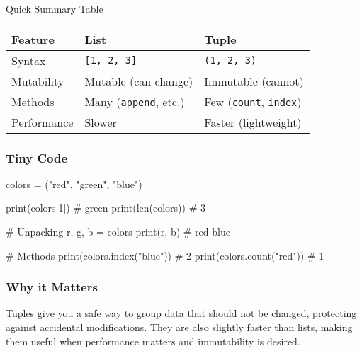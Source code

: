 \documentclass[
  letterpaper,
  DIV=11,
  numbers=noendperiod]{scrreprt}
\newenvironment{Shaded}{\begin{snugshade}}{\end{snugshade}}
\newcommand{\BuiltInTok}[1]{\textcolor[rgb]{0.00,0.23,0.31}{#1}}
\newcommand{\CommentTok}[1]{\textcolor[rgb]{0.37,0.37,0.37}{#1}}
\newcommand{\DecValTok}[1]{\textcolor[rgb]{0.68,0.00,0.00}{#1}}
\newcommand{\NormalTok}[1]{\textcolor[rgb]{0.00,0.23,0.31}{#1}}
\newcommand{\OperatorTok}[1]{\textcolor[rgb]{0.37,0.37,0.37}{#1}}
\newcommand{\StringTok}[1]{\textcolor[rgb]{0.13,0.47,0.30}{#1}}
\begin{document}
Quick Summary Table

\begin{longtable}[]{@{}lll@{}}
\toprule\noalign{}
Feature & List & Tuple \\
\midrule\noalign{}
\endhead
\bottomrule\noalign{}
\endlastfoot
Syntax & \texttt{{[}1,\ 2,\ 3{]}} & \texttt{(1,\ 2,\ 3)} \\
Mutability & Mutable (can change) & Immutable (cannot) \\
Methods & Many (\texttt{append}, etc.) & Few (\texttt{count},
\texttt{index}) \\
Performance & Slower & Faster (lightweight) \\
\end{longtable}

\subsubsection{Tiny Code}\label{tiny-code-24}

\begin{Shaded}
\begin{Highlighting}[]
\NormalTok{colors }\OperatorTok{=}\NormalTok{ (}\StringTok{"red"}\NormalTok{, }\StringTok{"green"}\NormalTok{, }\StringTok{"blue"}\NormalTok{)}

\BuiltInTok{print}\NormalTok{(colors[}\DecValTok{1}\NormalTok{])       }\CommentTok{\# green}
\BuiltInTok{print}\NormalTok{(}\BuiltInTok{len}\NormalTok{(colors))     }\CommentTok{\# 3}

\CommentTok{\# Unpacking}
\NormalTok{r, g, b }\OperatorTok{=}\NormalTok{ colors}
\BuiltInTok{print}\NormalTok{(r, b)            }\CommentTok{\# red blue}

\CommentTok{\# Methods}
\BuiltInTok{print}\NormalTok{(colors.index(}\StringTok{"blue"}\NormalTok{))  }\CommentTok{\# 2}
\BuiltInTok{print}\NormalTok{(colors.count(}\StringTok{"red"}\NormalTok{))   }\CommentTok{\# 1}
\end{Highlighting}
\end{Shaded}

\subsubsection{Why it Matters}\label{why-it-matters-24}

Tuples give you a safe way to group data that should not be changed,
protecting against accidental modifications. They are also slightly
faster than lists, making them useful when performance matters and
immutability is desired.
\end{document}

